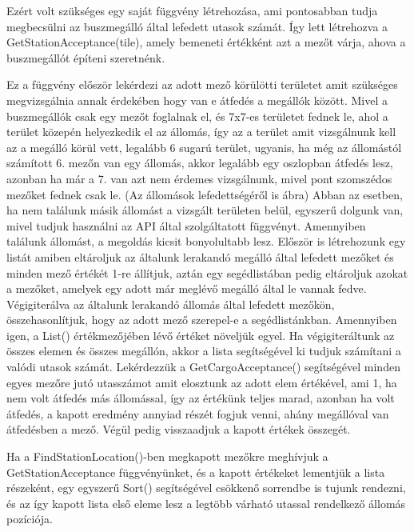 Ezért volt szükséges egy saját függvény létrehozása, ami pontosabban tudja megbecsülni az buszmegálló által lefedett utasok számát. Így lett létrehozva a GetStationAcceptance(tile), amely bemeneti értékként azt a mezőt várja, ahova a buszmegállót építeni szeretnénk.

Ez a függvény először lekérdezi az adott mező körülötti területet amit szükséges megvizsgálnia annak érdekében hogy van e átfedés a megállók között. Mivel a buszmegállók csak egy mezőt foglalnak el, és 7x7-es területet fednek le, ahol a terület közepén helyezkedik el az állomás, így az a terület amit vizsgálnunk kell az a megálló körül vett, legalább 6 sugarú terület, ugyanis, ha még az állomástól számított 6. mezőn van egy állomás, akkor legalább egy oszlopban átfedés lesz, azonban ha már a 7. van azt nem érdemes vizsgálnunk, mivel pont szomszédos mezőket fednek csak le. (Az állomások lefedettségéről is ábra) Abban az esetben, ha nem találunk másik állomást a vizsgált területen belül, egyszerű dolgunk van, mivel tudjuk használni az API által szolgáltatott függvényt. Amennyiben találunk állomást, a megoldás kicsit bonyolultabb lesz. Először is létrehozunk egy listát amiben eltároljuk az általunk lerakandó megálló által lefedett mezőket és minden mező értékét 1-re állítjuk, aztán egy segédlistában pedig eltároljuk azokat a mezőket, amelyek egy adott már meglévő megálló által le vannak fedve. Végigiterálva az általunk lerakandó állomás által lefedett mezőkön, összehasonlítjuk, hogy az adott mező szerepel-e a segédlistánkban. Amennyiben igen, a List() értékmezőjében lévő értéket növeljük egyel. Ha végigiteráltunk az összes elemen és összes megállón, akkor a lista segítségével ki tudjuk számítani a valódi utasok számát. Lekérdezzük a GetCargoAcceptance() segítségével minden egyes mezőre jutó utasszámot amit elosztunk az adott elem értékével, ami 1, ha nem volt átfedés más állomással, így az értékünk teljes marad, azonban ha volt átfedés, a kapott eredmény annyiad részét fogjuk venni, ahány megállóval van átfedésben a mező. Végül pedig visszaadjuk a kapott értékek összegét.

Ha a FindStationLocation()-ben megkapott mezőkre meghívjuk a GetStationAcceptance függvényünket, és a kapott értékeket lementjük a lista részeként, egy egyszerű Sort() segítségével csökkenő sorrendbe is tujunk rendezni, és az így kapott lista első eleme lesz a legtöbb várható utassal rendelkező állomás pozíciója.

